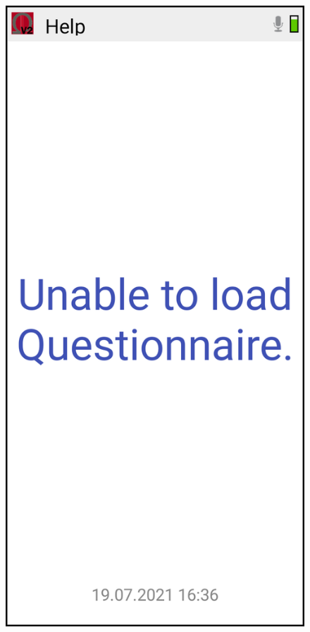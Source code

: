 \documentclass[11pt,a4paper,titlepage]{article}
\begin{document}
\begin{figure}
\vspace{-0.5cm}
		\centering
			\begin{minipage}{0.30\textwidth}
			\includegraphics[width=1.00\textwidth]{images/screen_error_quest.png}
			\label{fig:menu}
			\end{minipage}
	\end{figure}
\end{document}
